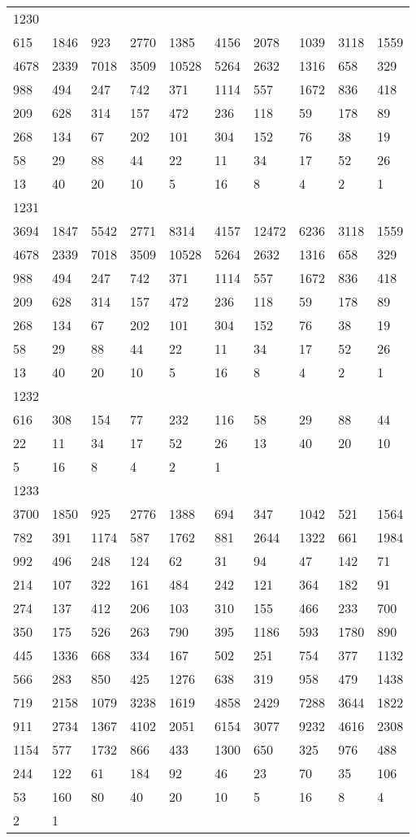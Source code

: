 \begin{longtable}{*{10}{l}}
1230&&&&&&&&&\\
615& 1846& 923& 2770& 1385& 4156& 2078& 1039& 3118& 1559\\
4678& 2339& 7018& 3509& 10528& 5264& 2632& 1316& 658& 329\\
988& 494& 247& 742& 371& 1114& 557& 1672& 836& 418\\
209& 628& 314& 157& 472& 236& 118& 59& 178& 89\\
268& 134& 67& 202& 101& 304& 152& 76& 38& 19\\
58& 29& 88& 44& 22& 11& 34& 17& 52& 26\\
13& 40& 20& 10& 5& 16& 8& 4& 2& 1\\

1231&&&&&&&&&\\
3694& 1847& 5542& 2771& 8314& 4157& 12472& 6236& 3118& 1559\\
4678& 2339& 7018& 3509& 10528& 5264& 2632& 1316& 658& 329\\
988& 494& 247& 742& 371& 1114& 557& 1672& 836& 418\\
209& 628& 314& 157& 472& 236& 118& 59& 178& 89\\
268& 134& 67& 202& 101& 304& 152& 76& 38& 19\\
58& 29& 88& 44& 22& 11& 34& 17& 52& 26\\
13& 40& 20& 10& 5& 16& 8& 4& 2& 1\\

1232&&&&&&&&&\\
616& 308& 154& 77& 232& 116& 58& 29& 88& 44\\
22& 11& 34& 17& 52& 26& 13& 40& 20& 10\\
5& 16& 8& 4& 2& 1& \\

1233&&&&&&&&&\\
3700& 1850& 925& 2776& 1388& 694& 347& 1042& 521& 1564\\
782& 391& 1174& 587& 1762& 881& 2644& 1322& 661& 1984\\
992& 496& 248& 124& 62& 31& 94& 47& 142& 71\\
214& 107& 322& 161& 484& 242& 121& 364& 182& 91\\
274& 137& 412& 206& 103& 310& 155& 466& 233& 700\\
350& 175& 526& 263& 790& 395& 1186& 593& 1780& 890\\
445& 1336& 668& 334& 167& 502& 251& 754& 377& 1132\\
566& 283& 850& 425& 1276& 638& 319& 958& 479& 1438\\
719& 2158& 1079& 3238& 1619& 4858& 2429& 7288& 3644& 1822\\
911& 2734& 1367& 4102& 2051& 6154& 3077& 9232& 4616& 2308\\
1154& 577& 1732& 866& 433& 1300& 650& 325& 976& 488\\
244& 122& 61& 184& 92& 46& 23& 70& 35& 106\\
53& 160& 80& 40& 20& 10& 5& 16& 8& 4\\
2& 1& \\


\end{longtable}
